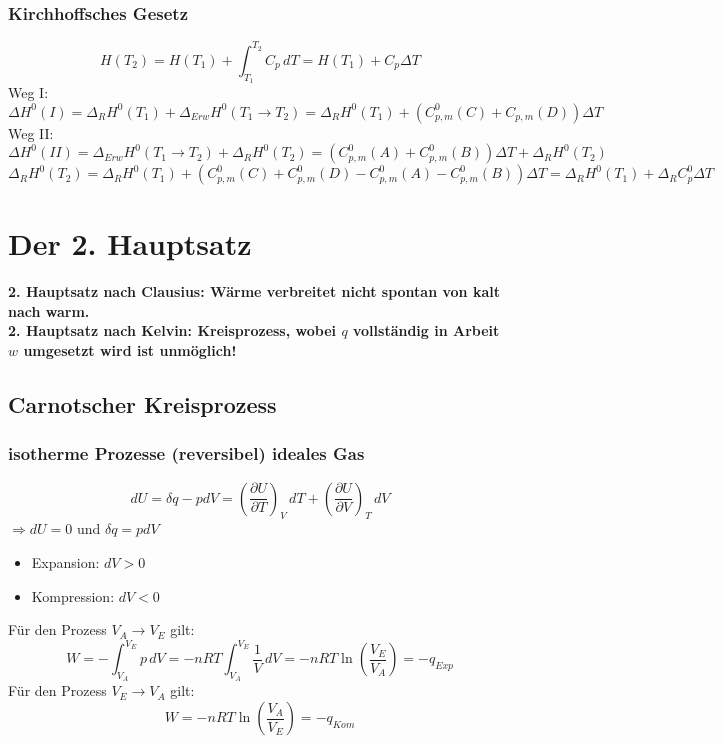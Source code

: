 \documentclass[a4paper, fleqn]{article}
\begin{document}
\subsubsection{Kirchhoffsches Gesetz}
\begin{equation*}
    H(T_2) = H(T_1) + \int_{T_1}^{T_2} C_p \, dT = H(T_1)+C_p \Delta T
\end{equation*}
Weg I:
\begin{equation*}
    \Delta H^0 (I) = \Delta_RH^0 (T_1) + \Delta_{Erw} H^0 (T_1 \rightarrow T_2) = \Delta_RH^0(T_1) + (C_{p,m}^0(C) + C_{p,m}(D)) \Delta T
\end{equation*}
Weg II:
\begin{equation*}
    \Delta H^0 (II) = \Delta_{Erw} H^0 (T_1 \rightarrow T_2) + \Delta_RH^0 (T_2) = (C_{p,m}^0 (A) + C_{p,m}^0 (B))\Delta T + \Delta_RH^0 (T_2)
\end{equation*}
\begin{equation*}
    \Delta_RH^0 (T_2) = \Delta_RH^0 (T_1) + (C_{p,m}^0 (C)+C_{p,m}^0 (D)-C_{p,m}^0(A)-C_{p,m}^0(B)) \Delta T = \Delta_RH^0 (T_1) + \Delta_RC_p^0 \Delta T
\end{equation*}

\section{Der 2. Hauptsatz}
\textbf{2. Hauptsatz nach Clausius: Wärme verbreitet nicht spontan von kalt nach warm.}\\
\textbf{2. Hauptsatz nach Kelvin: Kreisprozess, wobei $q$ vollständig in Arbeit $w$ umgesetzt wird ist unmöglich!}

\subsection{Carnotscher Kreisprozess}
\subsubsection{isotherme Prozesse (reversibel) ideales Gas}
\begin{equation*}
    dU = \delta q - pdV = \left(\frac{\partial U}{\partial T}\right)_V \, dT + \left(\frac{\partial U}{\partial V}\right)_T \, dV
\end{equation*}
$\Rightarrow dU = 0$ und $\delta q = pdV$\\
\begin{itemize}
    \item[] Expansion: $dV>0$
    \item[] Kompression: $dV<0$
\end{itemize}
Für den Prozess $V_A \rightarrow V_E$ gilt:
\begin{equation*}
    W = - \int_{V_A}^{V_E} p \, dV = -nRT \int_{V_A}^{V_E} \frac{1}{V} \, dV = -nRT \ln\left(\frac{V_E}{V_A}\right) = -q_{Exp}
\end{equation*}
Für den Prozess $V_E \rightarrow V_A$ gilt:
\begin{equation*}
    W = -nRT \ln\left(\frac{V_A}{V_E}\right)=-q_{Kom}
\end{equation*}
\end{document}
